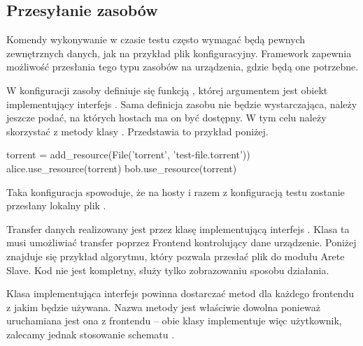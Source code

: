 \documentclass[00-praca-magisterska.tex]{subfiles}
\begin{document}
\subsection{Przesyłanie zasobów}

Komendy wykonywanie w czasie testu często wymagać będą pewnych zewnętrznych
danych, jak na przykład plik konfiguracyjny. Framework zapewnia możliwość
przesłania tego typu zasobów na urządzenia, gdzie będą one potrzebne.

W konfiguracji zasoby definiuje się funkcją , której
argumentem jest obiekt implementujący interfejs . Sama definicja
zasobu nie będzie wystarczająca, należy jeszcze podać, na których hostach ma on
być dostępny. W tym celu należy skorzystać z metody  klasy
. Przedstawia to przykład poniżej.

\begin{pythoncode}
  torrent = add_resource(File('torrent', 'test-file.torrent'))
  alice.use_resource(torrent)
  bob.use_resource(torrent)
\end{pythoncode}

Taka konfiguracja spowoduje, że na hosty  i  razem z
konfiguracją testu zostanie przesłany lokalny plik .

Transfer danych realizowany jest przez klasę implementującą interfejs
. Klasa ta musi umożliwiać transfer poprzez Frontend kontrolujący
dane urządzenie. Poniżej znajduje się przykład algorytmu, który pozwala przesłać
plik do modułu Arete Slave. Kod nie jest kompletny, służy tylko zobrazowaniu
sposobu działania.


Klasa implementująca interfejs  powinna dostarczać metod
 dla każdego frontendu z jakim będzie używana. Nazwa
metody jest właściwie dowolna ponieważ uruchamiana jest ona z frontendu -- obie
klasy implementuje więc użytkownik, zalecamy jednak stosowanie schematu
.
\end{document}
